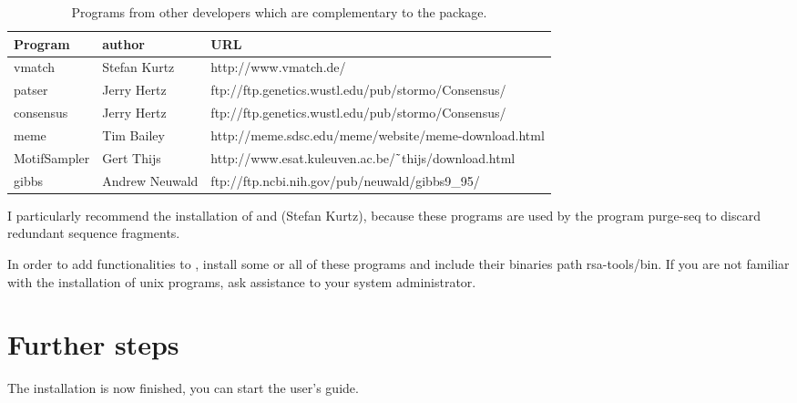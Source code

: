 \documentclass{article}
\begin{document}
\begin{table}
\begin{center}
\begin{tabular}{lll}
\hline
Program & author  & URL \\
\hline
vmatch & Stefan Kurtz & http://www.vmatch.de/ \\
patser & Jerry Hertz & ftp://ftp.genetics.wustl.edu/pub/stormo/Consensus/ \\
consensus & Jerry Hertz &  ftp://ftp.genetics.wustl.edu/pub/stormo/Consensus/ \\
meme & Tim Bailey & http://meme.sdsc.edu/meme/website/meme-download.html \\
MotifSampler & Gert Thijs & http://www.esat.kuleuven.ac.be/$\tilde{\hspace{0.4em}}$thijs/download.html \\
gibbs & Andrew Neuwald & ftp://ftp.ncbi.nih.gov/pub/neuwald/gibbs9\_95/ \\
\hline
\end{tabular}
\end{center}
\caption{\label{table:other_programs} Programs from other developers
  which are complementary to the \RSAT package.}
\end{table}

I particularly recommend the installation of  and
 (Stefan Kurtz), because these programs are used by
the program purge-seq to discard redundant sequence fragments.

In order to add functionalities to \RSAT, install some or all of these
programs and include their binaries path rsa-tools/bin. If you are not
familiar with the installation of unix programs, ask assistance to
your system administrator.


\section{Further steps}

The installation is now finished, you can start the user's guide. 
\end{document}
